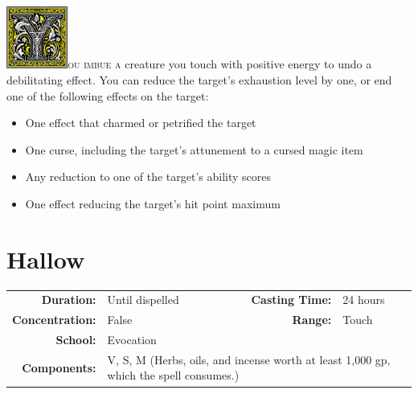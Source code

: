\documentclass[12pt,showtrims]{memoir}
\begin{document}
\vspace{1\baselineskip}\noindent
\lettrine[lines=4]{\includegraphics[height=58pt]{initials/Y.png}}{ou imbue a}
creature you touch with positive energy to undo a debilitating effect. You can
reduce the target’s exhaustion level by one, or end one of the following
effects on the target:
\begin{itemize}
\item One effect that charmed or petrified the target
\item One curse, including the target’s attunement to a cursed magic item
\item Any reduction to one of the target’s ability scores
\item One effect reducing the target’s hit point maximum
\end{itemize}

\newpage
\section*{Hallow}

{
\small\centering\vspace{-6pt}
\begin{tabular}{rlrl}
\toprule

\textbf{Duration:} & Until dispelled &
\textbf{Casting Time:} & 24 hours \\
\textbf{Concentration:} & False &
\textbf{Range:} & Touch \\
\textbf{School:} & Evocation \\
\textbf{Components:} & \multicolumn{3}{p{0.7\textwidth}}{V, S, M (Herbs, oils, and incense worth at least 1,000 gp, which the spell consumes.)}\\

\bottomrule
\end{tabular}
}
\end{document}

